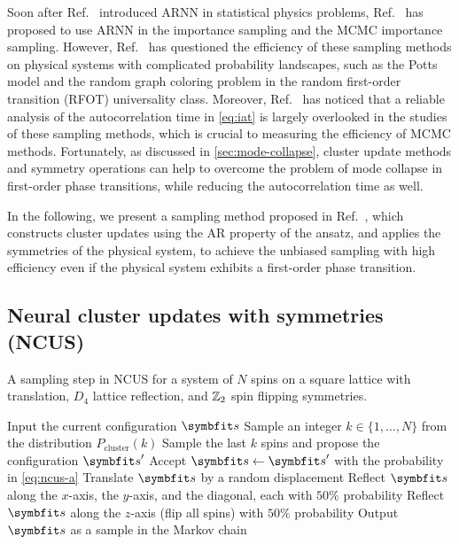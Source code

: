 Soon after Ref.~\cite{wu2019solving} introduced ARNN in statistical physics problems, Ref.~\cite{nicoli2020asymptotically} has proposed to use ARNN in the importance sampling and the MCMC importance sampling. However, Ref.~\cite{ciarella2023machine} has questioned the efficiency of these sampling methods on physical systems with complicated probability landscapes, such as the Potts model and the random graph coloring problem in the random first-order transition (RFOT) universality class. Moreover, Ref.~\cite{bialas2023analysis} has noticed that a reliable analysis of the autocorrelation time in \cref{eq:iat} is largely overlooked in the studies of these sampling methods, which is crucial to measuring the efficiency of MCMC methods. Fortunately, as discussed in \cref{sec:mode-collapse}, cluster update methods and symmetry operations can help to overcome the problem of mode collapse in first-order phase transitions, while reducing the autocorrelation time as well.

In the following, we present a sampling method proposed in Ref.~\cite{wu2021unbiased}, which constructs cluster updates using the AR property of the ansatz, and applies the symmetries of the physical system, to achieve the unbiased sampling with high efficiency even if the physical system exhibits a first-order phase transition.

\subsection{Neural cluster updates with symmetries (NCUS)}
\label{sec:ncus}

\begin{algorithm}[H]
\caption[Neural cluster updates with symmetries (NCUS)]{
A sampling step in NCUS for a system of $N$ spins on a square lattice with translation, $D_4$ lattice reflection, and $\mathbb{Z}_2$ spin flipping symmetries.
}
\label{alg:ncus}
\begin{algorithmic}[1]
\STATE Input the current configuration $\vs$
\STATE Sample an integer $k \in \{1, \ldots, N\}$ from the distribution $P_\text{cluster}(k)$
\STATE Sample the last $k$ spins and propose the configuration $\vs'$
\STATE Accept $\vs \gets \vs'$ with the probability in \cref{eq:ncus-a}
\STATE Translate $\vs$ by a random displacement
\STATE Reflect $\vs$ along the $x$-axis, the $y$-axis, and the diagonal, each with $50\%$ probability
\STATE Reflect $\vs$ along the $z$-axis (flip all spins) with $50\%$ probability
\STATE Output $\vs$ as a sample in the Markov chain
\end{algorithmic}
\end{algorithm}

